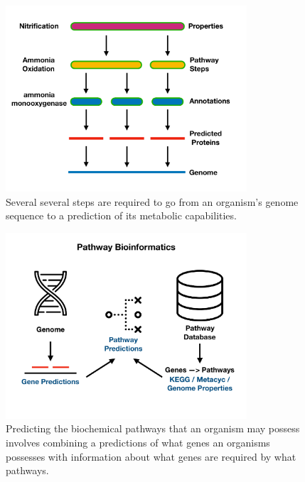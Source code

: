 \begin{figure}[!ht]
  \centering
	\includegraphics[width=0.8\textwidth]{media/pathway_analysis_steps.pdf}
	 \caption{Several several steps are required to go from an organism's genome sequence to a prediction of its metabolic capabilities.}
	 \label{fig:pathway-analysis-steps}
\end{figure}

\begin{figure}[!ht]
  \centering
	\includegraphics[width=0.8\textwidth]{media/pathway_bioinformatics.pdf}
	 \caption{Predicting the biochemical pathways that an organism may possess involves combining a predictions of what genes an organisms possesses with information about what genes are required by what pathways.}
	 \label{fig:pathway-analysis-overview}
\end{figure}

